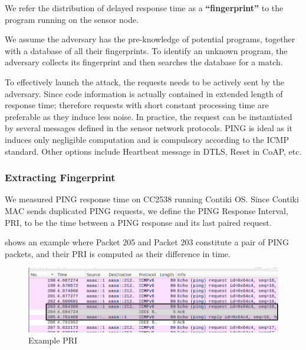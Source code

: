 \begin{definition}
	We refer the distribution of delayed response time as a \textbf{``fingerprint''} to the program running on the sensor node.
\end{definition}

We assume the adversary has the pre-knowledge of potential programs, together with a database of all their fingerprints. To identify an unknown program, the adversary collects its fingerprint and then searches the database for a match.

To effectively launch the attack, the requests needs to be actively sent by the adversary. Since code information is actually contained in extended  length of response time; therefore requests with short constant processing time are preferable as they induce less noise. In practice, the request can be instantiated by several messages defined in the sensor network protocols. PING is ideal as it induces only negligible computation and is compulsory according to the ICMP standard\cite{rfc4433}. Other options include Heartbeat message in DTLS\cite{rfc6520}, Reset in CoAP\cite{rfc7252}, etc.

\subsubsection{Extracting Fingerprint}
We measured PING response time on CC2538 running Contiki OS. Since Contiki MAC\cite{ContikiMAC} sends duplicated PING requests, we define the PING Response Interval, PRI, to be the time between a PING response and its last paired request. 

 shows an example where Packet 205 and Packet 203 constitute a pair of PING packets, and their PRI is computed as their difference in time.

\begin{figure}[!h]
	\centering
	\includegraphics[width=\textwidth]{fig/PRI_hl.png}
	\caption{Example PRI\label{ExamplePri}}
\end{figure}



